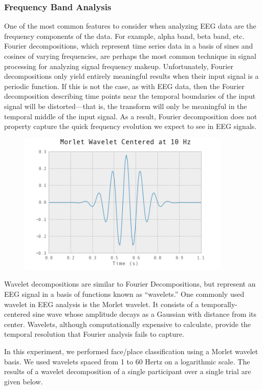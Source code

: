 \documentclass[11pt]{report}
\begin{document}
\subsubsection{Frequency Band Analysis}
	One of the most common features to consider when analyzing EEG data are the frequency components of the data.  For example, alpha band, beta band, etc.   Fourier decompositions, which represent time series data in a basis of sines and cosines of varying frequencies, are perhaps the most common technique in signal processing for analyzing signal frequency makeup.  Unfortunately, Fourier decompositions only yield entirely meaningful results when their input signal is a periodic function.   If this is not the case, as with EEG data, then the Fourier decomposition describing time points near the temporal boundaries of the input signal will be distorted—that is, the transform will only be meaningful in the temporal middle of the input signal.  As a result, Fourier decomposition does not property capture the quick frequency evolution we expect to see in EEG signals.  

\begin{figure}[t]
\centering
\includegraphics[width=4in]{morletwavelet}
\end{figure}


Wavelet decompositions are similar to Fourier Decompositions, but represent an EEG signal in a basis of functions known as “wavelets.”  One commonly used wavelet in EEG analysis is the Morlet wavelet.  It consists of a temporally-centered sine wave whose amplitude decays as a Gaussian with distance from its center.  Wavelets, although computationally expensive to calculate, provide the temporal resolution that Fourier analysis fails to capture.  

	In this experiment, we performed face/place classification using a Morlet wavelet basis.  We used wavelets spaced from 1 to 60 Hertz on a logarithmic scale.  The results of a wavelet decomposition of a single participant over a single trial are given below.   
\end{document}
